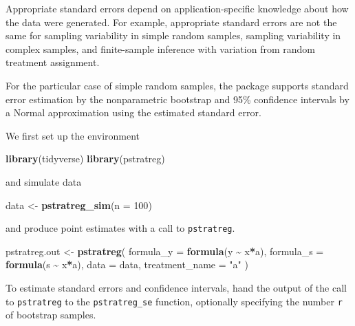\documentclass[
]{book}
\newenvironment{Shaded}{\begin{snugshade}}{\end{snugshade}}
\newcommand{\AttributeTok}[1]{\textcolor[rgb]{0.13,0.29,0.53}{#1}}
\newcommand{\DecValTok}[1]{\textcolor[rgb]{0.00,0.00,0.81}{#1}}
\newcommand{\FunctionTok}[1]{\textcolor[rgb]{0.13,0.29,0.53}{\textbf{#1}}}
\newcommand{\NormalTok}[1]{#1}
\newcommand{\OtherTok}[1]{\textcolor[rgb]{0.56,0.35,0.01}{#1}}
\newcommand{\SpecialCharTok}[1]{\textcolor[rgb]{0.81,0.36,0.00}{\textbf{#1}}}
\newcommand{\StringTok}[1]{\textcolor[rgb]{0.31,0.60,0.02}{#1}}
\begin{document}
Appropriate standard errors depend on application-specific knowledge about how the data were generated. For example, appropriate standard errors are not the same for sampling variability in simple random samples, sampling variability in complex samples, and finite-sample inference with variation from random treatment assignment.

For the particular case of simple random samples, the package supports standard error estimation by the nonparametric bootstrap and 95\% confidence intervals by a Normal approximation using the estimated standard error.

We first set up the environment

\begin{Shaded}
\begin{Highlighting}[]
\FunctionTok{library}\NormalTok{(tidyverse)}
\FunctionTok{library}\NormalTok{(pstratreg)}
\end{Highlighting}
\end{Shaded}

and simulate data

\begin{Shaded}
\begin{Highlighting}[]
\NormalTok{data }\OtherTok{\textless{}{-}} \FunctionTok{pstratreg\_sim}\NormalTok{(}\AttributeTok{n =} \DecValTok{100}\NormalTok{)}
\end{Highlighting}
\end{Shaded}

and produce point estimates with a call to \texttt{pstratreg}.

\begin{Shaded}
\begin{Highlighting}[]
\NormalTok{pstratreg.out }\OtherTok{\textless{}{-}} \FunctionTok{pstratreg}\NormalTok{(}
  \AttributeTok{formula\_y =} \FunctionTok{formula}\NormalTok{(y }\SpecialCharTok{\textasciitilde{}}\NormalTok{ x}\SpecialCharTok{*}\NormalTok{a),}
  \AttributeTok{formula\_s =} \FunctionTok{formula}\NormalTok{(s }\SpecialCharTok{\textasciitilde{}}\NormalTok{ x}\SpecialCharTok{*}\NormalTok{a),}
  \AttributeTok{data =}\NormalTok{ data,}
  \AttributeTok{treatment\_name =} \StringTok{"a"}
\NormalTok{)}
\end{Highlighting}
\end{Shaded}

To estimate standard errors and confidence intervals, hand the output of the call to \texttt{pstratreg} to the \texttt{pstratreg\_se} function, optionally specifying the number \texttt{r} of bootstrap samples.
\end{document}

